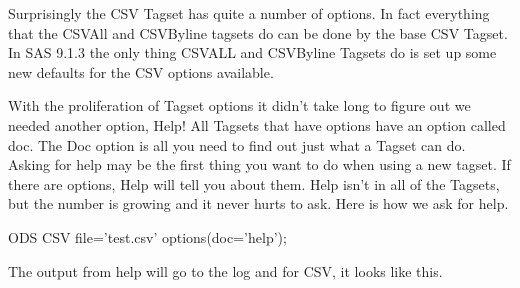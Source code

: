 Surprisingly the CSV Tagset has quite a number of options. In fact everything
that the CSVAll and CSVByline tagsets do can be done by the base CSV Tagset.
In SAS 9.1.3 the only thing CSVALL and CSVByline Tagsets do is set up some new defaults for
the CSV options available.

With the proliferation of Tagset options it didn't take long to figure out we needed
another option, Help!  All Tagsets that have options have an option called doc.  The Doc
option is all you need to find out just what a Tagset can do.  Asking for help may be
the first thing you want to do when using a new tagset.  If there are options, Help will
tell you about them.  Help isn't in all of the Tagsets, but the number is growing and
it never hurts to ask.  Here is how we ask for help.

\begin{sfvcode}
ODS CSV file='test.csv' options(doc='help');
\end{sfvcode}

The output from help will go to the log and for CSV, it looks like this.

